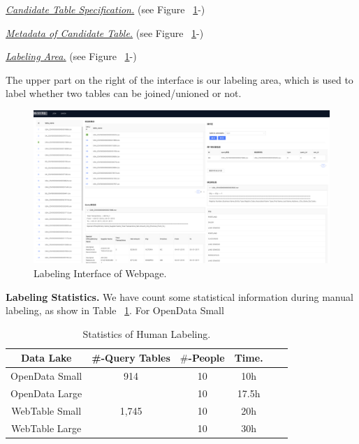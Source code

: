 \noindent \underline{\textit{Candidate Table Specification.}}  (see Figure ~\ref{fig:interface}-)

\noindent \underline{\textit{Metadata of Candidate Table.}}  (see Figure ~\ref{fig:interface}-)

\noindent \underline{\textit{Labeling Area.}}  (see Figure ~\ref{fig:interface}-)


 The upper part on the right of the interface is our labeling area, which is used to label whether two tables can be joined/unioned or not. 
\begin{figure}[h]
	\centering
	\includegraphics[width=1.0\linewidth]{fig/interface.png}
	\caption{Labeling Interface of Webpage.}
	\label{fig:interface}
\end{figure}

\noindent \textbf{Labeling Statistics.} 
We have count some statistical information during manual labeling, as show in Table ~\ref{Table:humanLabeling}. For OpenData Small

\begin{table}[t]
	\centering
	\caption{Statistics of Human Labeling.}
	\begin{tabular}{|c|c|c|c|c|c|}
		\hline
		\centering
		Data Lake  & \#-Query Tables & $\#$-People & Time.   \\
		\hline  
		OpenData Small& 914  & 10 & 10h   \\
		\hline
		OpenData Large&   & 10  &  17.5h   \\
		\hline
		WebTable Small& 1,745   & 10 &  20h  \\
		\hline
		WebTable Large&   & 10 &  30h  \\
		\hline
	\end{tabular}
	\label{Table:humanLabeling}
	
\end{table}